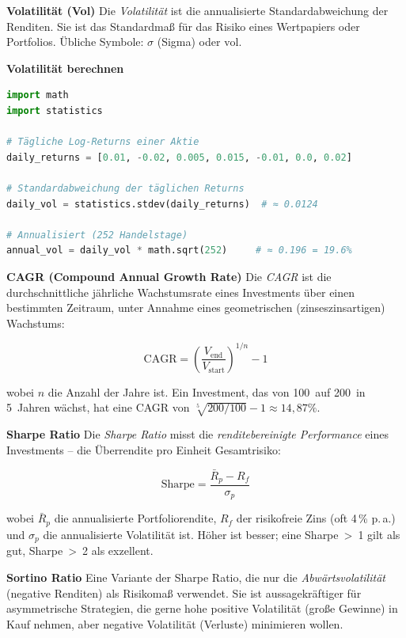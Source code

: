 \begin{definition}
\textbf{Volatilität (Vol)}
Die \emph{Volatilität} ist die annualisierte Standardabweichung der
Renditen. Sie ist das Standardmaß für das Risiko eines Wertpapiers
oder Portfolios. Übliche Symbole: $\sigma$ (Sigma) oder $\text{vol}$.
\end{definition}

\begin{beispiel}
\textbf{Volatilität berechnen}
\begin{lstlisting}[language=python]
import math
import statistics

# Tägliche Log-Returns einer Aktie
daily_returns = [0.01, -0.02, 0.005, 0.015, -0.01, 0.0, 0.02]

# Standardabweichung der täglichen Returns
daily_vol = statistics.stdev(daily_returns)  # ≈ 0.0124

# Annualisiert (252 Handelstage)
annual_vol = daily_vol * math.sqrt(252)     # ≈ 0.196 = 19.6%
\end{lstlisting}
\end{beispiel}

\begin{definition}
\textbf{CAGR (Compound Annual Growth Rate)}
Die \emph{CAGR} ist die durchschnittliche jährliche Wachstumsrate
eines Investments über einen bestimmten Zeitraum, unter Annahme
eines geometrischen (zinseszinsartigen) Wachstums:

\[
  \text{CAGR} = \left(\frac{V_\text{end}}{V_\text{start}}\right)^{1/n} - 1
\]

wobei $n$ die Anzahl der Jahre ist. Ein Investment, das von 100\,{}
auf 200\,{} in 5~Jahren wächst, hat eine CAGR von
$\sqrt[5]{200/100} - 1 \approx 14{,}87\%$.
\end{definition}

\begin{definition}
\textbf{Sharpe Ratio}
Die \emph{Sharpe Ratio} misst die \emph{renditebereinigte Performance}
eines Investments -- die Überrendite pro Einheit Gesamtrisiko:

\[
  \text{Sharpe} = \frac{\bar{R}_p - R_f}{\sigma_p}
\]

wobei $\bar{R}_p$ die annualisierte Portfoliorendite, $R_f$ der
risikofreie Zins (oft 4\,\% p.\,a.) und $\sigma_p$ die annualisierte
Volatilität ist. Höher ist besser; eine Sharpe~>~1 gilt als gut,
Sharpe~>~2 als exzellent.
\end{definition}

\begin{definition}
\textbf{Sortino Ratio}
Eine Variante der Sharpe Ratio, die nur die
\emph{Abwärtsvolatilität} (negative Renditen) als Risikomaß
verwendet. Sie ist aussagekräftiger für asymmetrische Strategien, die
gerne hohe positive Volatilität (große Gewinne) in Kauf nehmen, aber
negative Volatilität (Verluste) minimieren wollen.
\end{definition}

